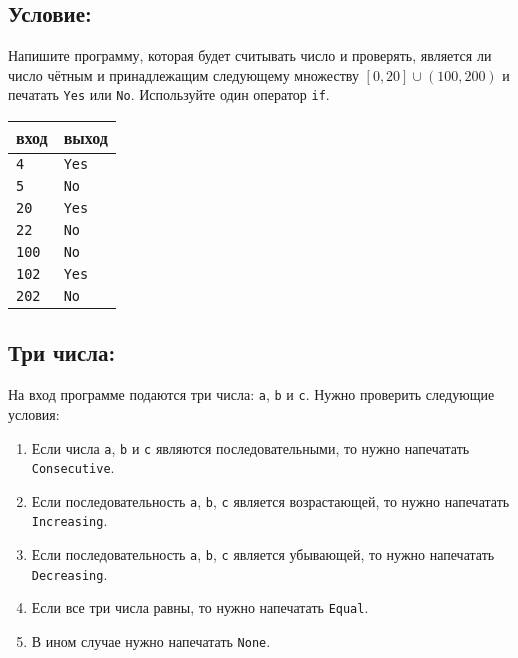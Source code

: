 \documentclass{article}
\begin{document}
\subsection{Условие:} 
Напишите программу, которая будет считывать число и проверять, является ли число чётным и принадлежащим следующему множеству 
$[0, 20] \cup (100, 200)$ и печатать \texttt{Yes} или \texttt{No}. Используйте один оператор \texttt{if}.
\begin{center}
\begin{tabular}{ l l }
 вход & выход \\ \hline
 \texttt{4} & \texttt{Yes}  \\ 
 \texttt{5} & \texttt{No}  \\ 
 \texttt{20} & \texttt{Yes} \\ 
 \texttt{22} & \texttt{No} \\  
 \texttt{100} & \texttt{No} \\
 \texttt{102} & \texttt{Yes} \\    
 \texttt{202} & \texttt{No} \\  
\end{tabular}
\end{center}

\subsection{Три числа:}
На вход программе подаются три числа: \texttt{a}, \texttt{b} и \texttt{c}. Нужно проверить следующие условия:
\begin{enumerate}
\item Если числа \texttt{a}, \texttt{b} и \texttt{c} являются последовательными, то нужно напечатать \texttt{Consecutive}.
\item Если последовательность \texttt{a}, \texttt{b}, \texttt{c} является возрастающей, то нужно напечатать \texttt{Increasing}.
\item Если последовательность \texttt{a}, \texttt{b}, \texttt{c} является убывающей, то нужно напечатать \texttt{Decreasing}.
\item Если все три числа равны, то нужно напечатать \texttt{Equal}.
\item В ином случае нужно напечатать \texttt{None}.
\end{enumerate}
\end{document}
